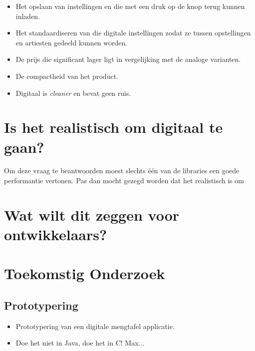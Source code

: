 \begin{itemize}
	\item Het opslaan van instellingen en die met een druk op de knop terug kunnen inladen.
	\item Het standaardiseren van die digitale instellingen zodat ze tussen opstellingen en artiesten gedeeld kunnen worden.
	\item De prijs die significant lager ligt in vergelijking met de analoge varianten.
	\item De compactheid van het product.
	\item Digitaal is \textit{cleaner} en bevat geen ruis.
\end{itemize}

\section{Is het realistisch om digitaal te gaan?}

Om deze vraag te beantwoorden moest slechts één van de libraries een goede performantie vertonen. Pas dan mocht gezegd worden dat het realistisch is om 

\section{Wat wilt dit zeggen voor ontwikkelaars?}

\section{Toekomstig Onderzoek}

\subsection{Prototypering}



\begin{itemize}
	\item Prototypering van een digitale mengtafel applicatie.
	\item Doe het niet in Java, doe het in C! Max...
\end{itemize}

\iffalse \lipsum[76-80] \fi

